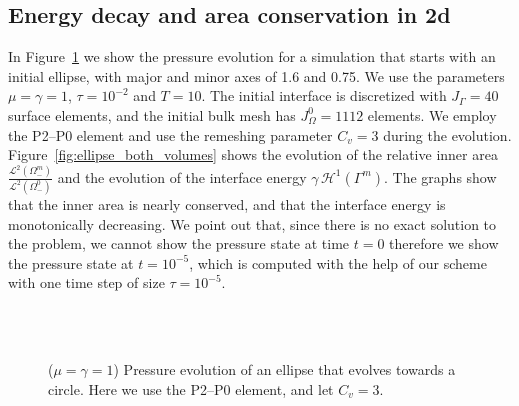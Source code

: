 \subsection{Energy decay and area conservation in 2d}
In Figure~\ref{fig:ellipse_both} we show the pressure evolution for a
simulation that starts with an initial ellipse, with major and minor axes of
1.6 and 0.75. We use the parameters $\mu = \gamma=1$, $\tau=10^{-2}$ and
$T=10$. The initial interface is discretized with $J_\Gamma = 40$ surface
elements, and the initial bulk mesh has $J_\Omega^0 = 1112$ elements. We employ
the P2--P0 element and use the remeshing parameter $C_v=3$ during the evolution.
Figure~\ref{fig:ellipse_both_volumes} shows the evolution of the relative inner
area $\frac{\mathcal{L}^2(\Omega^m_-)}{\mathcal{L}^2(\Omega^0_-)}$ and the
evolution of the interface energy $\gamma\,\mathcal{H}^{1}(\Gamma^m)$. The
graphs show that the inner area is nearly conserved, and that the interface
energy is monotonically decreasing. We point out that, since there is no exact
solution to the problem, we cannot show the pressure state at time $t=0$
therefore we show the pressure state at $t=10^{-5}$, which is computed with the
help of our scheme with one time step of size $\tau=10^{-5}$.
\begin{figure}[htbp]
\centering
{}\\
\\
\caption[Stokes ellipse pressure]
{($\mu=\gamma=1$) Pressure evolution of an ellipse that evolves towards a
circle. Here we use the P2--P0 element, and let $C_v = 3$.}
\label{fig:ellipse_both}
\end{figure}

